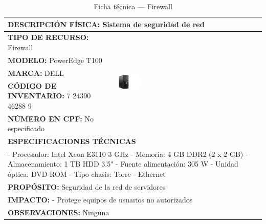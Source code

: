 \begin{table}[H]
\centering
\scriptsize
\setlength{\tabcolsep}{2pt}
\renewcommand{\arraystretch}{1.0}
\caption{Ficha técnica --- Firewall}\label{tab:firewall-1}
\begin{tabular}{|p{}|p{}|}
\hline
\multicolumn{2}{|l|}{\textbf{DESCRIPCIÓN FÍSICA:} Sistema de seguridad de red} \\ \hline
\textbf{TIPO DE RECURSO:} Firewall & 
\multirow{5}{*}{\includegraphics[width=0.18\textwidth,keepaspectratio]{tablas-images/cp1/firewall/firewall.png}} \\ \cline{1-1}
\textbf{MODELO:} PowerEdge T100 & \\ \cline{1-1}
\textbf{MARCA:} DELL & \\ \cline{1-1}
\textbf{CÓDIGO DE INVENTARIO:} 7 24390 46288 9 & \\ \cline{1-1}
\textbf{NÚMERO EN CPF:} No especificado & \\ \hline
\multicolumn{2}{|l|}{\textbf{ESPECIFICACIONES TÉCNICAS}} \\ \hline
\multicolumn{2}{|p{0.7\textwidth}|}{
- Procesador: Intel Xeon E3110 3 GHz
- Memoria: 4 GB DDR2 (2 x 2 GB)
- Almacenamiento: 1 TB HDD 3.5"
- Fuente alimentación: 305 W
- Unidad óptica: DVD-ROM
- Tipo chasis: Torre
- Ethernet
} \\ \hline
\multicolumn{2}{|l|}{\textbf{PROPÓSITO:} Seguridad de la red de servidores} \\ \hline
\multicolumn{2}{|p{0.7\textwidth}|}{\textbf{IMPACTO:} - Protege equipos de usuarios no autorizados} \\ \hline
\multicolumn{2}{|p{0.7\textwidth}|}{\textbf{OBSERVACIONES:} Ninguna} \\ \hline
\end{tabular}
\end{table}